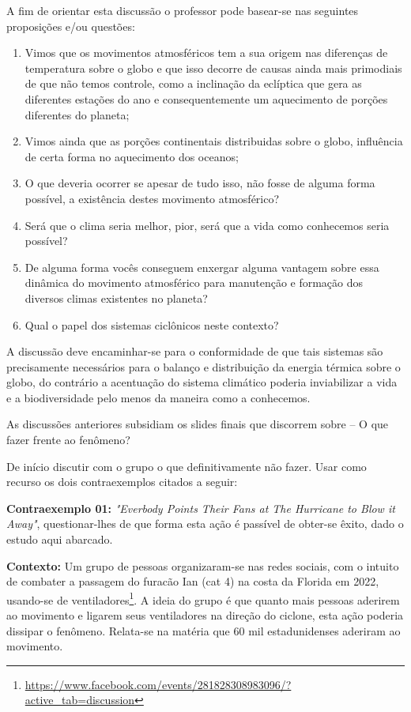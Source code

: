 A fim de orientar esta discussão o professor pode basear-se nas seguintes proposições e/ou questões:
\begin{enumerate}[label=\alph *)]
		\item Vimos que os movimentos atmosféricos tem a sua origem nas diferenças de temperatura sobre o globo e que isso decorre de causas ainda mais primodiais de que não temos controle, como a inclinação da eclíptica que gera as diferentes estações do ano e consequentemente um aquecimento de porções diferentes do planeta;
		\item Vimos ainda que as porções continentais distribuidas sobre o globo, influência de certa forma no aquecimento dos oceanos;
		\item O que deveria ocorrer se apesar de tudo isso, não fosse de alguma forma possível, a existência destes movimento atmosférico?
		\item Será que o clima seria melhor, pior, será que a vida como conhecemos seria possível?
		\item De alguma forma vocês conseguem enxergar alguma vantagem sobre essa dinâmica do movimento atmosférico para manutenção e formação dos diversos climas existentes no planeta?
		\item Qual o papel dos sistemas ciclônicos neste contexto?
\end{enumerate}
A discussão deve encaminhar-se para o conformidade de que tais sistemas são precisamente necessários para o balanço e distribuição da energia térmica sobre o globo, do contrário a acentuação do sistema climático poderia inviabilizar a vida e a biodiversidade pelo menos da maneira como a conhecemos.

As discussões anteriores subsidiam os slides finais que discorrem sobre -- O que fazer frente ao fenômeno?

De início discutir com o grupo o que definitivamente não fazer. Usar como recurso os dois contraexemplos citados a seguir: 

\textbf{Contraexemplo 01:} \textit{"Everbody Points Their Fans at The Hurricane to Blow it Away"}, questionar-lhes de que forma esta ação é passível de obter-se êxito, dado o estudo aqui abarcado.
\par\textbf{Contexto:} Um grupo de pessoas organizaram-se nas redes sociais, com o intuito de combater a passagem do furacão Ian (cat 4) na costa da Florida em 2022, usando-se de ventiladores\footnote{\url{https://www.facebook.com/events/281828308983096/?active_tab=discussion}}. A ideia do grupo é que quanto mais pessoas aderirem ao movimento e ligarem seus ventiladores na direção do ciclone, esta ação poderia dissipar o fenômeno. Relata-se na matéria que 60 mil estadunidenses aderiram ao movimento.

